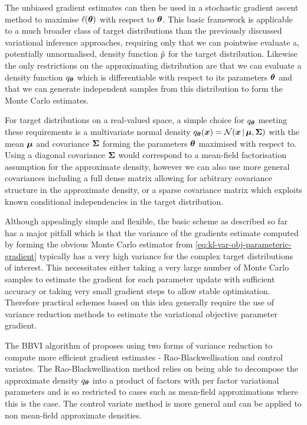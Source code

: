The unbiased gradient estimates can then be used in a stochastic gradient ascent method \citep{robbins1951stochastic} to maximise $\ell(\boldsymbol{\theta})$ with respect to $\boldsymbol{\theta}$. This basic framework is applicable to a much broader class of target distributions than the previously discussed variational inference approaches, requiring only that we can pointwise evaluate a, potentially unnormalised, density function $\tilde{p}$ for the target distribution. Likewise the only restrictions on the approximating distribution are that we can evaluate a density function $q_{\boldsymbol{\theta}}$ which is differentiable with respect to its parameters $\boldsymbol{\theta}$ and that we can generate independent samples from this distribution to form the Monte Carlo estimates. 

For target distributions on a real-valued space, a simple choice for $q_{\boldsymbol{\theta}}$ meeting these requirements is a multivariate normal density $q_{\vct{\theta}}(\vct{x}) = \nrm{\vct{x}\gvn\vct{\mu},\mtx{\Sigma}}$ with the mean $\boldsymbol{\mu}$ and covariance $\boldsymbol{\Sigma}$ forming the parameters $\boldsymbol{\theta}$ maximised with respect to. Using a diagonal covariance $\boldsymbol{\Sigma}$ would correspond to a mean-field factorisation assumption for the approximate density, however we can also use more general covariances including a full dense matrix allowing for arbitrary covariance structure in the approximate density, or a sparse covariance matrix which exploits known conditional independencies in the target distribution.

Although appealingly simple and flexible, the basic scheme as described so far has a major pitfall which is that the variance of the gradients estimate computed by forming the obvious Monte Carlo estimator from \eqref{eq:kl-var-obj-parameteric-gradient} typically has a very high variance for the complex target distributions of interest. This necessitates either taking a very large number of Monte Carlo samples to estimate the gradient for each parameter update with sufficient accuracy or taking very small gradient steps to allow stable optimisation. Therefore practical schemes based on this idea generally require the use of variance reduction methods to estimate the variational objective parameter gradient.

The \ac{BBVI} algorithm of \citep{ranganath2014black} proposes using two forms of variance reduction to compute more efficient gradient estimates - Rao-Blackwellisation and control variates. The Rao-Blackwellisation method relies on being able to decompose the approximate density $q_{\boldsymbol{\theta}}$ into a product of factors with per factor variational parameters and is so restricted to cases such as mean-field approximations where this is the case. The control variate method is more general and can be applied to non mean-field approximate densities.

